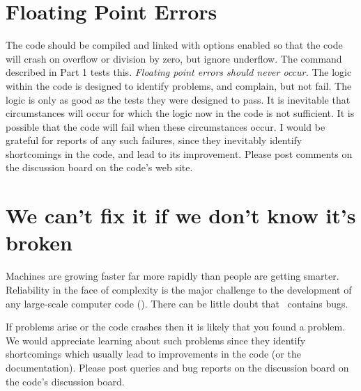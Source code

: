 \section{Floating Point Errors}

The code should be compiled and linked with options enabled so that the
code will crash on overflow or division by zero, but ignore underflow.
The  command described in Part 1 tests this.  \emph{Floating point errors should never occur.}
The logic within the code is designed to identify
problems, and complain, but not fail.
The logic is only as good as the
tests they were designed to pass.
It is inevitable that circumstances will
occur for which the logic now in the code is not sufficient.
It is possible
that the code will fail when these circumstances occur.
I would be grateful
for reports of any such failures, since they inevitably identify shortcomings
in the code, and lead to its improvement.
Please post comments on the
discussion board on the code's web site.

\section{We can't fix it if we don't know it's broken}

Machines are growing faster far more rapidly than people are getting
smarter.
Reliability in the face of complexity is the major challenge to
the development of any large-scale computer code (\citealp{Ferland2001b}).  There
can be little doubt that \Cloudy\ contains bugs.

If problems arise or the code crashes then it is likely that you found
a problem.  We would appreciate learning about such problems since they
identify shortcomings which usually lead to improvements in the code (or
the documentation).  Please post queries and bug reports on the discussion
board on the code's discussion board.
